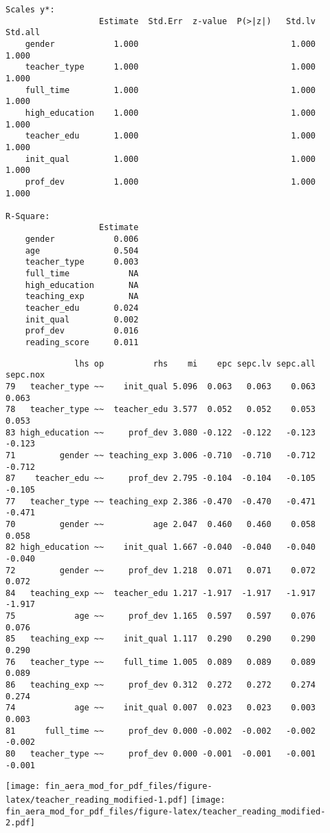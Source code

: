 \documentclass[
]{article}
\begin{document}
\begin{verbatim}
Scales y*:
                   Estimate  Std.Err  z-value  P(>|z|)   Std.lv  Std.all
    gender            1.000                               1.000    1.000
    teacher_type      1.000                               1.000    1.000
    full_time         1.000                               1.000    1.000
    high_education    1.000                               1.000    1.000
    teacher_edu       1.000                               1.000    1.000
    init_qual         1.000                               1.000    1.000
    prof_dev          1.000                               1.000    1.000

R-Square:
                   Estimate
    gender            0.006
    age               0.504
    teacher_type      0.003
    full_time            NA
    high_education       NA
    teaching_exp         NA
    teacher_edu       0.024
    init_qual         0.002
    prof_dev          0.016
    reading_score     0.011
\end{verbatim}

\begin{verbatim}
              lhs op          rhs    mi    epc sepc.lv sepc.all sepc.nox
79   teacher_type ~~    init_qual 5.096  0.063   0.063    0.063    0.063
78   teacher_type ~~  teacher_edu 3.577  0.052   0.052    0.053    0.053
83 high_education ~~     prof_dev 3.080 -0.122  -0.122   -0.123   -0.123
71         gender ~~ teaching_exp 3.006 -0.710  -0.710   -0.712   -0.712
87    teacher_edu ~~     prof_dev 2.795 -0.104  -0.104   -0.105   -0.105
77   teacher_type ~~ teaching_exp 2.386 -0.470  -0.470   -0.471   -0.471
70         gender ~~          age 2.047  0.460   0.460    0.058    0.058
82 high_education ~~    init_qual 1.667 -0.040  -0.040   -0.040   -0.040
72         gender ~~     prof_dev 1.218  0.071   0.071    0.072    0.072
84   teaching_exp ~~  teacher_edu 1.217 -1.917  -1.917   -1.917   -1.917
75            age ~~     prof_dev 1.165  0.597   0.597    0.076    0.076
85   teaching_exp ~~    init_qual 1.117  0.290   0.290    0.290    0.290
76   teacher_type ~~    full_time 1.005  0.089   0.089    0.089    0.089
86   teaching_exp ~~     prof_dev 0.312  0.272   0.272    0.274    0.274
74            age ~~    init_qual 0.007  0.023   0.023    0.003    0.003
81      full_time ~~     prof_dev 0.000 -0.002  -0.002   -0.002   -0.002
80   teacher_type ~~     prof_dev 0.000 -0.001  -0.001   -0.001   -0.001
\end{verbatim}

\texttt{[image: fin\_aera\_mod\_for\_pdf\_files/figure-latex/teacher\_reading\_modified-1.pdf]}
\texttt{[image: fin\_aera\_mod\_for\_pdf\_files/figure-latex/teacher\_reading\_modified-2.pdf]}
\end{document}
